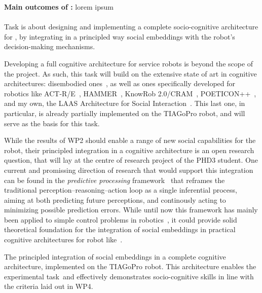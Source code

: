 \begin{framed}
    {\noindent\bf Main outcomes of \tCB:} lorem ipsum 
\end{framed}

\paragraph{\TCC}

Task \TCC is about designing and implementing a complete socio-cognitive
architecture for \project, by integrating in a principled way social embeddings
with the robot's decision-making mechanisms.

Developing a full cognitive architecture for service robots is beyond the scope
of the \project project. As such, this task will build on the extensive state
of art in cognitive architectures: disembodied
ones~\cite{chong2007integrated,vernon2007survey,kingdon2008review,duch2008cognitive,langley2009cognitive,taatgen2010past,thorisson2012cognitive},
as well as ones specifically developed for robotics like
ACT-R/E~\cite{trafton2013act}, HAMMER~\cite{demiris2006hierarchical}, KnowRob
2.0/CRAM~\cite{beetz2010cram, beetz2018knowrob},
POETICON++~\cite{antunes2016human}, and my own, the LAAS Architecture for
Social Interaction~\cite{lemaignan2017artificial}. This last one, in
particular, is already partially implemented on the TIAGoPro robot, and will
serve as the basis for this task.

While the results of WP2 should enable a range of new social capabilities for
the robot, their principled integration in a cognitive architecture is an open
research question, that will lay at the centre of research project of the PHD3
student. One current and promissing direction of research that would support
this integration can be found in the \emph{predictive processing}
framework~\cite{schillaci2016exploration} that reframes the traditional
perception--reasoning--action loop as a single inferential process, aiming at
both predicting future perceptions, and continously acting to minimizing
possible prediction errors. While until now this framework has mainly been
applied to simple control problems in robotics~\cite{ciria2021predictive}, it
could provide solid theoretical foundation for the integration of social embeddings in practical cognitive architectures for robot like~\cite{lemaignan2017artificial}.

\begin{framed}
 The principled integration of social
embeddings in a complete cognitive architecture, implemented on the
    TIAGoPro robot. This architecture enables the experimental task~\tDD and effectively demonstrates socio-cognitive skills in line with the criteria laid out in WP4.
\end{framed}



